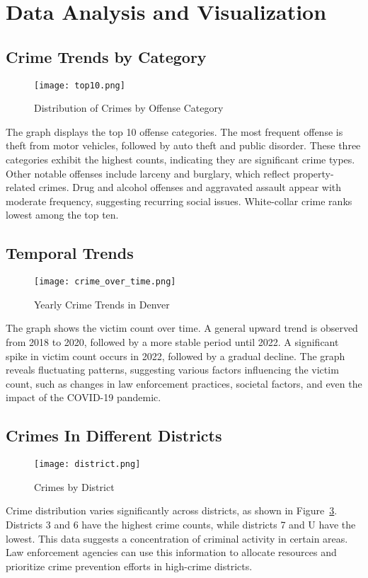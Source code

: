 \documentclass{article}
\begin{document}
\section{Data Analysis and Visualization}
\label{sec:data_analysis}

\subsection{Crime Trends by Category}
\begin{figure}[H]
    \centering
    \texttt{[image: top10.png]}
    \caption{Distribution of Crimes by Offense Category}
    \label{fig:offense_category}
\end{figure}
The graph displays the top 10 offense categories. The most frequent offense is theft from motor vehicles, followed by auto theft and public disorder. These three categories exhibit the highest counts, indicating they are significant crime types. Other notable offenses include larceny and burglary, which reflect property-related crimes. Drug and alcohol offenses and aggravated assault appear with moderate frequency, suggesting recurring social issues. White-collar crime ranks lowest among the top ten.

\subsection{Temporal Trends}
\begin{figure}[H]
    \centering
    \texttt{[image: crime\_over\_time.png]}
    \caption{Yearly Crime Trends in Denver}
    \label{fig:crime_over_time}
\end{figure}
The graph shows the victim count over time. A general upward trend is observed from 2018 to 2020, followed by a more stable period until 2022. A significant spike in victim count occurs in 2022, followed by a gradual decline. The graph reveals fluctuating patterns, suggesting various factors influencing the victim count, such as changes in law enforcement practices, societal factors, and even the impact of the COVID-19 pandemic.

\subsection{Crimes In Different Districts}
\begin{figure}[H]
    \centering
    \texttt{[image: district.png]}
    \caption{Crimes by District}
    \label{fig:crime_by_district}
\end{figure}
Crime distribution varies significantly across districts, as shown in Figure~\ref{fig:crime_by_district}. Districts 3 and 6 have the highest crime counts, while districts 7 and U have the lowest. This data suggests a concentration of criminal activity in certain areas. Law enforcement agencies can use this information to allocate resources and prioritize crime prevention efforts in high-crime districts.
\end{document}
